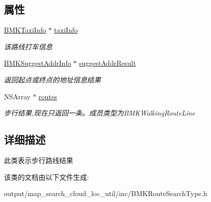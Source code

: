 \subsection*{属性}
\begin{DoxyCompactItemize}
\item 
\hypertarget{interface_b_m_k_walking_route_result_a64e1ed0711dbed93a53cce9f3fd5b477}{\hyperlink{interface_b_m_k_taxi_info}{B\+M\+K\+Taxi\+Info} $\ast$ \hyperlink{interface_b_m_k_walking_route_result_a64e1ed0711dbed93a53cce9f3fd5b477}{taxi\+Info}}\label{interface_b_m_k_walking_route_result_a64e1ed0711dbed93a53cce9f3fd5b477}

\begin{DoxyCompactList}\small\item\em 该路线打车信息 \end{DoxyCompactList}\item 
\hypertarget{interface_b_m_k_walking_route_result_aa609ce663bd13a0c2a96df209d3adc67}{\hyperlink{interface_b_m_k_suggest_addr_info}{B\+M\+K\+Suggest\+Addr\+Info} $\ast$ \hyperlink{interface_b_m_k_walking_route_result_aa609ce663bd13a0c2a96df209d3adc67}{suggest\+Addr\+Result}}\label{interface_b_m_k_walking_route_result_aa609ce663bd13a0c2a96df209d3adc67}

\begin{DoxyCompactList}\small\item\em 返回起点或终点的地址信息结果 \end{DoxyCompactList}\item 
\hypertarget{interface_b_m_k_walking_route_result_a5d3582bcf623a0a164e68d4bc9b329f3}{N\+S\+Array $\ast$ \hyperlink{interface_b_m_k_walking_route_result_a5d3582bcf623a0a164e68d4bc9b329f3}{routes}}\label{interface_b_m_k_walking_route_result_a5d3582bcf623a0a164e68d4bc9b329f3}

\begin{DoxyCompactList}\small\item\em 步行结果,现在只返回一条。成员类型为\+B\+M\+K\+Walking\+Route\+Line \end{DoxyCompactList}\end{DoxyCompactItemize}


\subsection{详细描述}
此类表示步行路线结果 

该类的文档由以下文件生成\+:\begin{DoxyCompactItemize}
\item 
output/map\+\_\+search\+\_\+cloud\+\_\+loc\+\_\+util/inc/B\+M\+K\+Route\+Search\+Type.\+h\end{DoxyCompactItemize}
